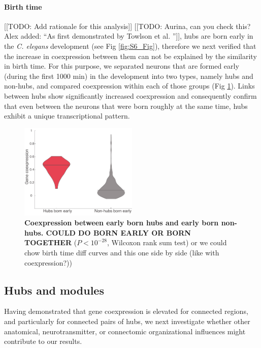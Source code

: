 \documentclass[10pt,letterpaper]{article}
\begin{document}
\paragraph{Birth time}
[[TODO: Add rationale for this analysis]]
[[TODO: Aurina, can you check this? Alex added: ``As first demonstrated by Towlson et al. \cite{Towlson:2013gf}'']], hubs are born early in the \textit{C. elegans} development \cite{Varier2011} (see Fig \ref{fig:S6_Fig}), therefore we next verified that the increase in coexpression between them can not be explained by the similarity in birth time. 
For this purpose, we separated neurons that are formed early (during the first 1000 min) in the development into two types, namely hubs and non-hubs, and compared coexpression within each of those groups (Fig \ref{fig:BirthTimeHubs}). 
Links between hubs show significantly increased coexpression and consequently confirm that even between the neurons that were born roughly at the same time, hubs exhibit a unique transcriptional pattern.
\begin{figure}[t]
  \centering
    \includegraphics[width=0.5\textwidth]{BirthTimeHubs.pdf}
 \caption{\textbf{Coexpression between early born hubs and early born non-hubs. COULD DO BORN EARLY OR BORN TOGETHER} ($P < 10^{-28}$, Wilcoxon rank sum test) or we could chow birth time diff curves and this one side by side (like with coexpression?))
}
\label{fig:BirthTimeHubs}
\end{figure}


\subsection*{Hubs and modules}
Having demonstrated that gene coexpression is elevated for connected regions, and particularly for connected pairs of hubs, we next investigate whether other anatomical, neurotransmitter, or connectomic organizational influences might contribute to our results.
\end{document}
